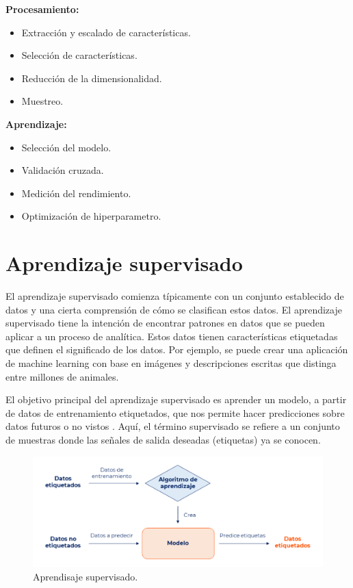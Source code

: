 \textbf{Procesamiento:}
  \begin{itemize}
    \item Extracción y escalado de características.
    \item Selección de características.
    \item Reducción de la dimensionalidad.
    \item Muestreo.
  \end{itemize}
\textbf{Aprendizaje:}%
  \begin{itemize}
    \item Selección del modelo.
    \item Validación cruzada.
    \item Medición del rendimiento.
    \item Optimización de hiperparametro.
  \end{itemize}

\section{Aprendizaje supervisado}

El aprendizaje supervisado comienza típicamente con un conjunto establecido de datos y una cierta comprensión de cómo se clasifican estos datos. El aprendizaje supervisado tiene la intención de encontrar patrones en datos que se pueden aplicar a un proceso de analítica. Estos datos tienen características etiquetadas que definen el significado de los datos. Por ejemplo, se puede crear una aplicación de machine learning con base en imágenes y descripciones escritas que distinga entre millones de animales\cite{ibm}.

\vspace{1\baselineskip}
El objetivo principal del aprendizaje supervisado es aprender un modelo, a partir de datos de entrenamiento etiquetados, que nos permite hacer predicciones sobre datos futuros o no vistos \cite{mirjalili2020python}. Aquí, el término supervisado se refiere a un conjunto de muestras donde las señales
de salida deseadas (etiquetas) ya se conocen.

\begin{figure}[H]
  \begin{center}
    \includegraphics[scale=0.60]{./aprendisaje_supervisado.png}
    \caption{Aprendisaje supervisado\cite{decide}.}
    \label{fig:aprendisajesupervisado}
  \end{center}
\end{figure}

